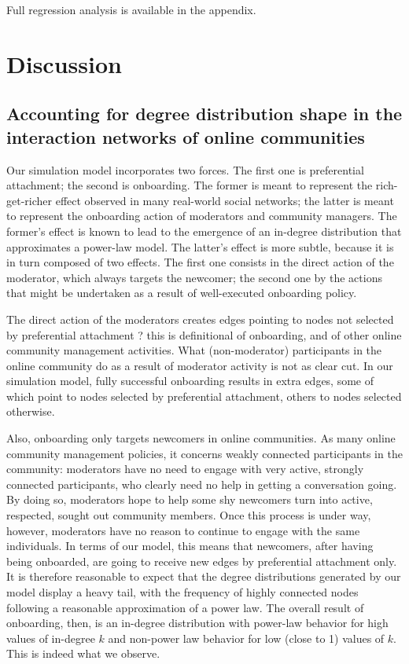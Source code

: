 \documentclass{nws}
\begin{document}
Full regression analysis is available in the appendix.

\section{Discussion}

\subsection{Accounting for degree distribution shape in the interaction networks of online communities}

Our simulation model incorporates two forces. The first one is preferential attachment; the second is onboarding. The former is meant to represent the rich-get-richer effect observed in many real-world social networks; the latter is meant to represent the onboarding action of moderators and community managers. The former's effect is known to lead to the emergence of an in-degree distribution that approximates a power-law model. The latter's effect is more subtle, because it is in turn composed of two effects. The first one consists in the direct action of the moderator, which  always targets the newcomer; the second one by the actions that might be undertaken as a result of well-executed onboarding policy. 

The direct action of the moderators creates edges pointing to nodes not selected by preferential attachment ? this is definitional of onboarding, and of other online community management activities. What (non-moderator) participants in the online community do as a result of moderator activity is not as clear cut. In our simulation model, fully successful onboarding results in extra edges, some of which point to nodes selected by preferential attachment, others to nodes selected otherwise. 

Also, onboarding only targets newcomers in online communities. As many online community management policies, it concerns weakly connected participants in the community: moderators have no need to engage with very active, strongly connected participants, who clearly need no help in getting a conversation going. By doing so, moderators hope to help some shy newcomers turn into active, respected, sought out community members. Once this process is under way, however, moderators have no reason to continue to engage with the same individuals. In terms of our model, this means that newcomers, after having being onboarded, are going to receive new edges by preferential attachment only. It is therefore reasonable to expect that the degree distributions generated by our model display a heavy tail, with the frequency of highly connected nodes following a reasonable approximation of a power law. The overall result of onboarding, then, is an in-degree distribution with power-law behavior for high values of in-degree $k$ and non-power law behavior for low (close to 1) values of $k$. This is indeed what we observe. 
\end{document}
